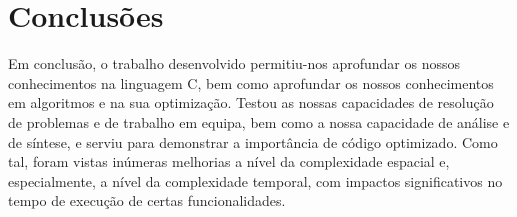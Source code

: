 
\chapter{Conclusões}
\label{ch:conclusoes}
{

Em conclusão, o trabalho desenvolvido permitiu-nos aprofundar os nossos conhecimentos na linguagem C, bem como aprofundar os nossos conhecimentos em algoritmos e na sua optimização. Testou as nossas capacidades de resolução de problemas e de trabalho em equipa, bem como a nossa capacidade de análise e de síntese, e serviu para demonstrar a importância de código optimizado.
Como tal, foram vistas inúmeras melhorias a nível da complexidade espacial e, especialmente, a nível da complexidade temporal, com impactos significativos no tempo de execução de certas funcionalidades.

}
